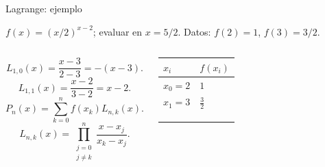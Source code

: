 \documentclass[original_version/main.tex]{subfiles}
\begin{document}
\begin{frame}[t]{Lagrange: ejemplo}
\par\noindent\begin{minipage}[t][7.5mm][t]{\textwidth}\small\strut $f(x)=(x/2)^{x-2}$; evaluar en $x=5/2$. Datos: $f(2)=1$, $f(3)=3/2$.\end{minipage}\par\nointerlineskip
\begin{columns}[T]\small\setlength{\abovedisplayskip}{4pt}\setlength{\belowdisplayskip}{4pt}\small\[L_{1,0}(x)=\frac{x-3}{2-3}=-(x-3).\]
\[L_{1,1}(x)=\frac{x-2}{3-2}=x-2.\]\[P_n(x)=\sum_{k=0}^n f(x_k)L_{n,k}(x).\]\[L_{n,k}(x)=\prod_{\substack{j=0\\j\ne k}}^n\frac{x-x_j}{x_k-x_j}.\]\begingroup\small\setlength{\tabcolsep}{3pt}\begin{center}\begin{tabular}{|C{.42\textwidth}|C{.42\textwidth}|}\hline
\rule[-2mm]{0pt}{6mm}$x_i$&$f(x_i)$\\\hline
\rule[-2.5mm]{0pt}{6mm}$x_0=2$&$1$\\\hline
\rule[-2.5mm]{0pt}{6mm}$x_1=3$&$\frac{3}{2}$\\\hline
\rule[-2.5mm]{0pt}{6mm}&\\\hline
\rule[-2.5mm]{0pt}{6mm}&\\\hline
\rule[-2.5mm]{0pt}{6mm}&\\\hline
\end{tabular}\end{center}\endgroup\par
\end{columns}
\end{frame}
\end{document}
